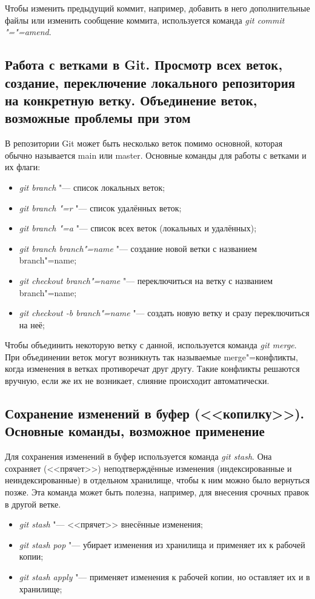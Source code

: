 \documentclass[12pt]{article}
\begin{document}
Чтобы изменить предыдущий коммит, например, добавить в него дополнительные файлы или изменить сообщение коммита, используется команда \textit{git commit "="=amend}.

\subsection{Работа с ветками в Git. Просмотр всех веток, создание, переключение локального репозитория на конкретную ветку. Объединение веток, возможные проблемы при этом}
В репозитории Git может быть несколько веток помимо основной, которая обычно называется main или master. Основные команды для работы с ветками и их флаги:
\begin{itemize}
\item \textit{git branch} "--- список локальных веток;
\item \textit{git branch "=r} "--- список удалённых веток;
\item \textit{git branch "=a} "--- список всех веток (локальных и удалённых);
\item \textit{git branch branch"=name} "--- создание новой ветки с названием branch"=name;
\item \textit{git checkout branch"=name} "--- переключиться на ветку с названием branch"=name;
\item \textit{git checkout -b branch"=name} "--- создать новую ветку и сразу переключиться на неё;
\end{itemize}

Чтобы объединить некоторую ветку с данной, используется команда \textit{git merge}. При объединении веток могут возникнуть так называемые merge"=конфликты, когда изменения в ветках противоречат друг другу. Такие конфликты решаются вручную, если же их не возникает, слияние происходит автоматически.

\subsection{Сохранение изменений в буфер (<<копилку>>). Основные команды, возможное применение}
Для сохранения изменений в буфер используется команда \textit{git stash}. Она сохраняет (<<прячет>>) неподтверждённые изменения (индексированные и неиндексированные) в отдельном хранилище, чтобы к ним можно было вернуться позже. Эта команда может быть полезна, например, для внесения срочных правок в другой ветке.
\begin{itemize}
\item \textit{git stash} "--- <<прячет>> внесённые изменения;
\item \textit{git stash pop} "--- убирает изменения из хранилища и применяет их к рабочей копии;
\item \textit{git stash apply} "--- применяет изменения к рабочей копии, но оставляет их и в хранилище;
\end{itemize}
\end{document}
